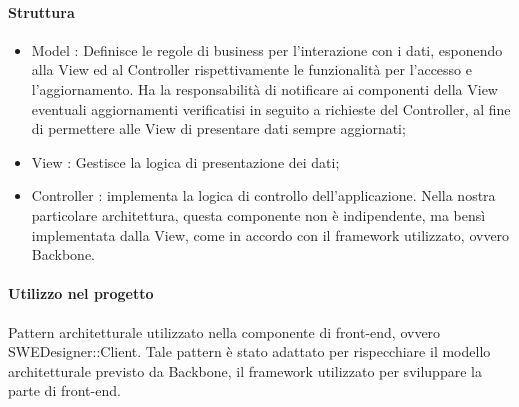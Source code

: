\documentclass[../PianoDiQualifica.tex]{subfiles}
\begin{document}
				\paragraph{Struttura\\}			
				\begin{itemize}
					\item Model : Definisce le regole di business per l’interazione con i dati, esponendo alla View ed al Controller rispettivamente le funzionalità per l’accesso e l’aggiornamento.
					Ha la responsabilità di notificare ai componenti della View eventuali aggiornamenti verificatisi in seguito a richieste del Controller, al fine di permettere alle View di presentare dati sempre aggiornati;
					\item View : Gestisce la logica di presentazione dei dati;
					\item Controller : implementa la logica di controllo dell’applicazione. Nella nostra particolare architettura, questa componente non è indipendente, ma bensì implementata dalla View, come in accordo con il framework utilizzato, ovvero Backbone.
				\end{itemize}			
				\paragraph{Utilizzo nel progetto\\}
				Pattern architetturale utilizzato nella componente di front-end, ovvero SWEDesigner::Client. Tale pattern è stato adattato per rispecchiare il modello architetturale previsto da Backbone, il framework utilizzato per sviluppare la parte di front-end.
				
\end{document}
